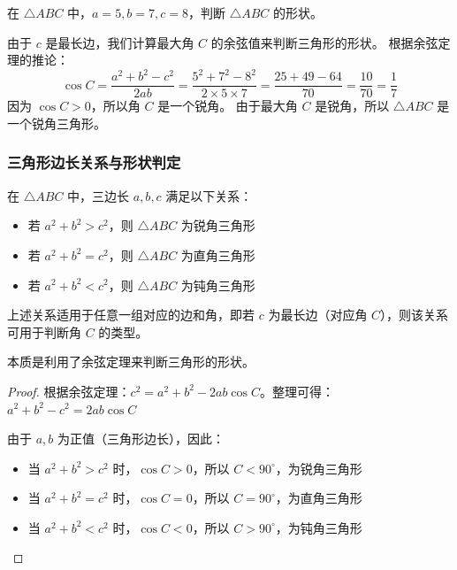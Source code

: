 \begin{example}
    在 $\triangle ABC$ 中，$a=5, b=7, c=8$，判断 $\triangle ABC$ 的形状。
\end{example}
\begin{solution}
    由于 $c$ 是最长边，我们计算最大角 $C$ 的余弦值来判断三角形的形状。
    根据余弦定理的推论：
    $$
        \cos C = \frac{a^2 + b^2 - c^2}{2ab} = \frac{5^2 + 7^2 - 8^2}{2 \times 5 \times 7} = \frac{25 + 49 - 64}{70} = \frac{10}{70} = \frac{1}{7}
    $$
    因为 $\cos C > 0$，所以角 $C$ 是一个锐角。
    由于最大角 $C$ 是锐角，所以 $\triangle ABC$ 是一个锐角三角形。
\end{solution}

\vspace{2em}

\subsubsection{三角形边长关系与形状判定}

\begin{theorem}[三角形边长关系]
    在 $\triangle ABC$ 中，三边长 $a, b, c$ 满足以下关系：
    \begin{itemize}
        \item 若 $a^2+b^2>c^2$，则 $\triangle ABC$ 为锐角三角形
        \item 若 $a^2+b^2=c^2$，则 $\triangle ABC$ 为直角三角形
        \item 若 $a^2+b^2<c^2$，则 $\triangle ABC$ 为钝角三角形
    \end{itemize}
    上述关系适用于任意一组对应的边和角，即若 $c$ 为最长边（对应角 $C$），则该关系可用于判断角 $C$ 的类型。

    本质是利用了余弦定理来判断三角形的形状。
\end{theorem}

\begin{proof}
    根据余弦定理：$c^2 = a^2 + b^2 - 2ab\cos C$。整理可得：
    $a^2 + b^2 - c^2 = 2ab\cos C$

    由于 $a, b$ 为正值（三角形边长），因此：
    \begin{itemize}
        \item 当 $a^2+b^2>c^2$ 时，$\cos C > 0$，所以 $C < 90^\circ$，为锐角三角形
        \item 当 $a^2+b^2=c^2$ 时，$\cos C = 0$，所以 $C = 90^\circ$，为直角三角形
        \item 当 $a^2+b^2<c^2$ 时，$\cos C < 0$，所以 $C > 90^\circ$，为钝角三角形
    \end{itemize}
\end{proof}

